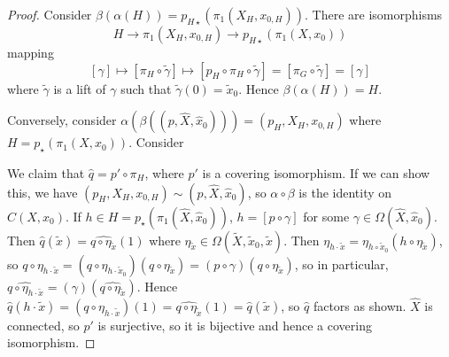 \begin{proof}
	Consider \( \beta(\alpha(H)) = p_{H\star}(\pi_1(X_H,x_{0,H})) \).
	There are isomorphisms
	\[ H \to \pi_1(X_H,x_{0,H}) \to p_{H\star}(\pi_1(X,x_0)) \]
	mapping
	\[ [\gamma] \mapsto [\pi_H \circ \widetilde \gamma] \mapsto [p_H \circ \pi_H \circ \widetilde \gamma] = [\pi_G \circ \widetilde \gamma] = [\gamma] \]
	where \( \widetilde \gamma \) is a lift of \( \gamma \) such that \( \widetilde\gamma(0) = \widetilde x_0 \).
	Hence \( \beta(\alpha(H)) = H \).

	Conversely, consider \( \alpha(\beta((p, \hat X, \hat x_0))) = (p_H, X_H, x_{0,H}) \) where \( H = p_\star(\pi_1(X,x_0)) \).
	Consider
	\begin{center}
	\end{center}
	We claim that \( \hat q = p' \circ \pi_H \), where \( p' \) is a covering isomorphism.
	If we can show this, we have \( (p_H, X_H, x_{0,H}) \sim (p, \hat X, \hat x_0) \), so \( \alpha \circ \beta \) is the identity on \( C(X,x_0) \).
	If \( h \in H = p_\star(\pi_1(\hat X, \hat x_0)) \), \( h = [p \circ \gamma] \) for some \( \gamma \in \Omega(\hat X, \hat x_0) \).
	Then \( \hat q(\widetilde x) = \widehat{q \circ \eta_{\widetilde x}}(1) \) where \( \eta_{\widetilde x} \in \Omega(\widetilde X, \widetilde x_0, \widetilde x) \).
	Then \( \eta_{h \cdot \widetilde x} = \eta_{h \circ \widetilde x_0} (h \circ \eta_{\widetilde x}) \), so \( q \circ \eta_{h \cdot \widetilde x} = (q \circ \eta_{h \cdot \widetilde x_0})(q \circ \eta_{\widetilde x}) = (p \circ \gamma)(q \circ \eta_{\widetilde x}) \), so in particular, \( \widehat{q \circ \eta_{h \cdot \widetilde x}} = (\gamma)(\widehat{q \circ \eta_{\widetilde x}}) \).
	Hence \( \hat q(h \cdot \widetilde x) = (q \circ \eta_{h \cdot \widetilde x})(1) = \widehat{q \circ \eta_{\widetilde x}}(1) = \hat q(\widetilde x) \), so \( \hat q \) factors as shown.
	\( \hat X \) is connected, so \( p' \) is surjective, so it is bijective and hence a covering isomorphism.
\end{proof}
